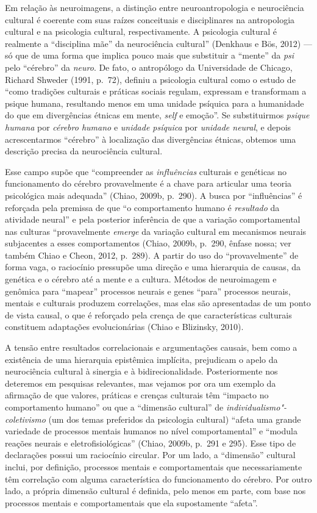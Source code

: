 Em relação às neuroimagens, a distinção entre neuroantropologia e
neurociência cultural é coerente com suas raízes conceituais e
disciplinares na antropologia cultural e na psicologia cultural,
respectivamente. A psicologia cultural é realmente a ``disciplina mãe''
da neurociência cultural'' (Denkhaus e Bös, 2012) --- só que de uma
forma que implica pouco mais que substituir a ``mente'' da \emph{psi}
pelo ``cérebro'' da \emph{neuro}. De fato, o antropólogo da Universidade
de Chicago, Richard Shweder (1991, p.~72), definiu a psicologia cultural
como o estudo de ``como tradições culturais e práticas sociais regulam,
expressam e transformam a psique humana, resultando menos em uma unidade
psíquica para a humanidade do que em divergências étnicas em mente, \emph{self}
e emoção''. Se substituirmos \emph{psique humana} por \emph{cérebro
humano} e \emph{unidade psíquica} por \emph{unidade neural}, e depois
acrescentarmos ``cérebro'' à localização das divergências étnicas,
obtemos uma descrição precisa da neurociência cultural.

Esse campo supõe que ``compreender as \emph{influências} culturais e
genéticas no funcionamento do cérebro provavelmente é a chave para
articular uma teoria psicológica mais adequada'' (Chiao, 2009b, p.~290).
A busca por ``influências'' é reforçada pela premissa de que ``o
comportamento humano é \emph{resultado} da atividade neural'' e pela
posterior inferência de que a variação comportamental nas culturas
``provavelmente \emph{emerge} da variação cultural em mecanismos neurais
subjacentes a esses comportamentos (Chiao, 2009b, p.~290, ênfase nossa;
ver também Chiao e Cheon, 2012, p.~289). A partir do uso do
``provavelmente'' de forma vaga, o raciocínio pressupõe uma direção e
uma hierarquia de causas, da genética e o cérebro até a mente e a
cultura. Métodos de neuroimagem e genômica para ``mapear'' processos
neurais e genes ``para'' processos neurais, mentais e culturais produzem
correlações, mas elas são apresentadas de um ponto de vista causal, o
que é reforçado pela crença de que características culturais constituem
adaptações evolucionárias (Chiao e Blizinsky, 2010).

A tensão entre resultados correlacionais e argumentações causais, bem
como a existência de uma hierarquia epistêmica implícita, prejudicam o
apelo da neurociência cultural à sinergia e à bidirecionalidade.
Posteriormente nos deteremos em pesquisas relevantes, mas vejamos por
ora um exemplo da afirmação de que valores, práticas e crenças culturais
têm ``impacto no comportamento humano'' ou que a ``dimensão cultural''
de \emph{individualismo"-coletivismo} (um dos temas preferidos da
psicologia cultural) ``afeta uma grande variedade de processos mentais
humanos no nível comportamental'' e ``modula reações neurais e
eletrofisiológicas'' (Chiao, 2009b, p.~291 e 295). Esse tipo de
declarações possui um raciocínio circular. Por um lado, a ``dimensão''
cultural inclui, por definição, processos mentais e comportamentais que
necessariamente têm correlação com alguma característica do
funcionamento do cérebro. Por outro lado, a própria dimensão cultural é
definida, pelo menos em parte, com base nos processos mentais e
comportamentais que ela supostamente ``afeta''.

